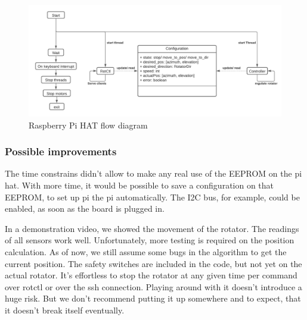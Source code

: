\begin{figure}[H]
	\centering
	\includegraphics[width=\linewidth]{../art/Code flow chart.pdf}
	\caption{Raspberry Pi HAT flow diagram}
\end{figure}

\subsubsection{Possible improvements}
The time constrains didn't allow to make any real use of the EEPROM on the pi hat. With more time, it would be possible to save a configuration on that EEPROM, to set up pi the pi automatically. The I2C bus, for example, could be enabled, as soon as the board is plugged in.

In a demonstration video, we showed the movement of the rotator. The readings of all sensors work well. Unfortunately, more testing is required on the position calculation. As of now, we still assume some bugs in the algorithm to get the current position. The safety switches are included in the code, but not yet on the actual rotator. It's effortless to stop the rotator at any given time per command over rotctl or over the ssh connection. Playing around with it doesn't introduce a huge risk. But we don't recommend putting it up somewhere and to expect, that it doesn't break itself eventually.